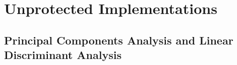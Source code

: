 \section{Unprotected Implementations}

\subsection{Principal Components Analysis and Linear Discriminant Analysis}

%
